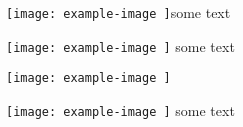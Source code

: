 \texttt{[image: 
	example-image
]}some text

\texttt{[image: 
	example-image
]} some text

\texttt{[image: 
	example-image
]} %

\texttt{[image: 
	example-image
]}  some text
